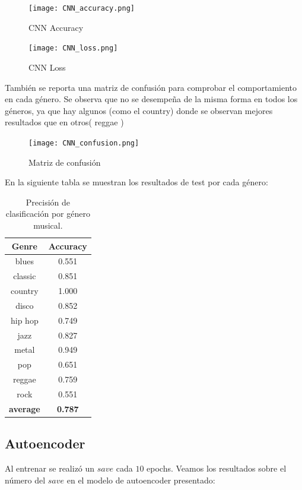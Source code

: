 \documentclass[colorinlistoftodos,twoside,twocolumn,10pt]{article} %
\begin{document}
\begin{figure}[h!] 
	\centering
	\texttt{[image: CNN\_accuracy.png]}
	\caption{CNN Accuracy}
\end{figure}

\begin{figure}[h!] 
	\centering
	\texttt{[image: CNN\_loss.png]}
	\caption{CNN Loss}
\end{figure}

Tambi\'en se reporta una matriz de confusi\'on para comprobar
el comportamiento en cada g\'enero. Se observa que no
se desempe\~na de la misma forma en todos los g\'eneros,
ya que hay algunos (como el country) donde se
observan mejores resultados que en otros( reggae )
\begin{figure}[h!] %
	\centering
	\texttt{[image: CNN\_confusion.png]}
	\caption{Matriz de confusi\'on}
\end{figure}

En la siguiente tabla se muestran los resultados de test por cada g\'enero:
\begin{table}[h]
\centering
\begin{tabular}{|c|c|}
\hline
\textbf{Genre} & \textbf{Accuracy} \\ \hline
blues & 0.551 \\ \hline
classic & 0.851 \\ \hline
country & 1.000 \\ \hline
disco & 0.852 \\ \hline
hip hop & 0.749 \\ \hline
jazz & 0.827 \\ \hline
metal & 0.949 \\ \hline
pop & 0.651 \\ \hline
reggae & 0.759 \\ \hline
rock & 0.551 \\ \hline
\textbf{average} & \textbf{0.787} \\ \hline
\end{tabular}
\caption{Precisi\'on de clasificaci\'on por g\'enero musical.}
\label{tabla:1}
\end{table}

\subsection{Autoencoder}
Al entrenar se realiz\'o un $save$ cada $10$ epochs. Veamos los resultados sobre el n\'umero del $save$ en el modelo de autoencoder presentado:
\end{document}
